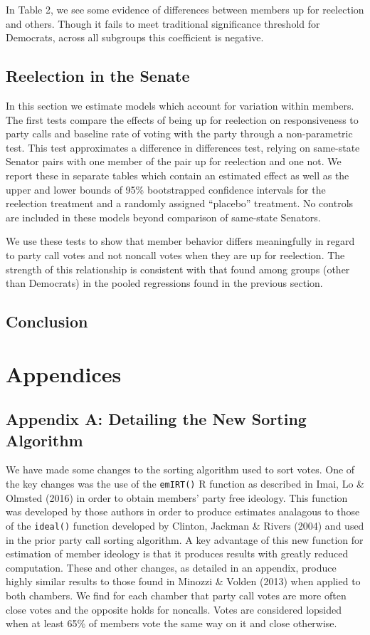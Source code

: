 \documentclass[12pt]{article}
\begin{document}
In Table 2, we see some evidence of differences between members up for reelection and others. Though it fails to meet traditional significance threshold for Democrats, across all subgroups this coefficient is negative. 

\subsection{Reelection in the Senate}

In this section we estimate models which account for variation within members. The first tests compare the effects of being up for reelection on responsiveness to party calls and baseline rate of voting with the party through a non-parametric test. This test approximates a difference in differences test, relying on same-state Senator pairs with one member of the pair up for reelection and one not. We report these in separate tables which contain an estimated effect as well as the upper and lower bounds of 95\% bootstrapped confidence intervals for the reelection treatment and a randomly assigned ``placebo'' treatment. No controls are included in these models beyond comparison of same-state Senators. 

We use these tests to show that member behavior differs meaningfully in regard to party call votes and not noncall votes when they are up for reelection. The strength of this relationship is consistent with that found among groups (other than Democrats) in the pooled regressions found in the previous section.


\subsection{Conclusion}

\section{Appendices}

\subsection{Appendix A: Detailing the New Sorting Algorithm}

We have made some changes to the sorting algorithm used to sort votes. One of the key changes was the use of the \verb|emIRT()| R function as described in Imai, Lo \& Olmsted (2016) in order to obtain members' party free ideology. This function was developed by those authors in order to produce estimates analagous to those of the \verb|ideal()| function developed by Clinton, Jackman \& Rivers (2004) and used in the prior party call sorting algorithm. A key advantage of this new function for estimation of member ideology is that it produces results with greatly reduced computation. These and other changes, as detailed in an appendix, produce highly similar results to those found in Minozzi \& Volden (2013) when applied to both chambers. We find for each chamber that party call votes are more often close votes and the opposite holds for noncalls. Votes are considered lopsided when at least 65\% of members vote the same way on it and close otherwise.
\end{document}
